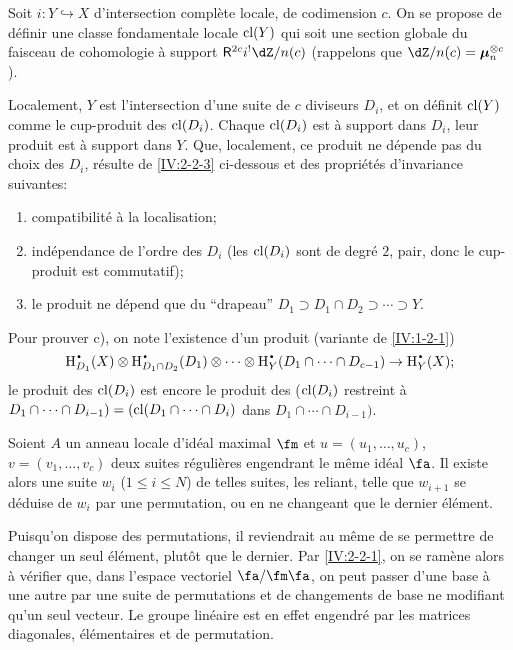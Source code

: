 Soit $i:Y\hookrightarrow X$ d'intersection complète locale, de codimension 
$c$. On se propose de définir une classe fondamentale locale 
$\operatorname{cl}(Y)$ qui soit une section globale du faisceau de cohomologie à support 
$\R^{2c}i^! \dZ/n(c)$ (rappelons que $\dZ/n(c)=\dmu_n^{\otimes c}$). 

Localement, $Y$ est l'intersection d'une suite de $c$ diviseurs $D_i$, et on 
définit $\operatorname{cl}(Y)$ comme le cup-produit des $\operatorname{cl}(D_i)$. Chaque $\operatorname{cl}(D_i)$ est 
à support dans $D_i$, leur produit est à support dans $Y$. Que, localement, 
ce produit ne dépende pas du choix des $D_i$, résulte de \ref{IV:2-2-3} 
ci-dessous et des propriétés d'invariance suivantes:
\begin{enumerate}[\indent a)]
  \item compatibilité à la localisation;
  \item indépendance de l'ordre des $D_i$ (les $\operatorname{cl}(D_i)$ sont de degré 
    $2$, pair, donc le cup-produit est commutatif);
  \item le produit ne dépend que du ``drapeau'' 
    $D_1\supset D_1\cap D_2\supset \cdots\supset Y$. 
\end{enumerate}
Pour prouver c), on note l'existence d'un produit (variante de \ref{IV:1-2-1}) 
\[
  \h_{D_1}^\bullet(X)\otimes \h_{D_1\cap D_2}^\bullet(D_1)\otimes \cdots \otimes \h_Y^\bullet(D_1\cap \cdots \cap D_{c-1}) \to \h_Y^\bullet(X) \text{;}
\]
le produit des $\operatorname{cl}(D_i)$ est encore le produit des ($\operatorname{cl}(D_i)$ restreint à 
$D_1\cap \cdots \cap D_{i-1})=(\operatorname{cl}(D_1\cap \cdots \cap D_i)$ dans 
$D_1\cap \cdots \cap D_{i-1})$. 





\begin{lemma}\label{IV:2-2-3}
Soient $A$ un anneau locale d'idéal maximal $\fm$ et $u=(u_1,\dots,u_c)$, 
$v=(v_1,\dots,v_c)$ deux suites régulières engendrant le même idéal 
$\fa$. Il existe alors une suite $w_i$ ($1\leqslant i\leqslant N$) de telles 
suites, les reliant, telle que $w_{i+1}$ se déduise de $w_i$ par une 
permutation, ou en ne changeant que le dernier élément.
\end{lemma}

Puisqu'on dispose des permutations, il reviendrait au même de se permettre de 
changer un seul élément, plutôt que le dernier. Par \ref{IV:2-2-1}, on se 
ramène alors à vérifier que, dans l'espace vectoriel $\fa/\fm\fa$, on 
peut passer d'une base à une autre par une suite de permutations et de 
changements de base ne modifiant qu'un seul vecteur. Le groupe linéaire est 
en effet engendré par les matrices diagonales, élémentaires et de 
permutation. 





